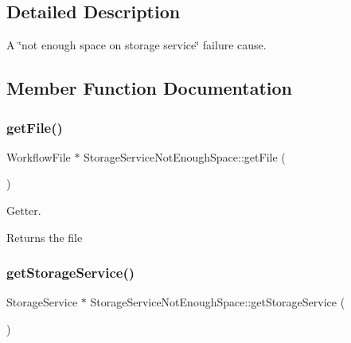 \subsection{Detailed Description}
A \char`\"{}not enough space on storage service\char`\"{} failure cause. 

\subsection{Member Function Documentation}
\mbox{\label{class_storage_service_not_enough_space_afc2e70e5464f2898a7b3e58048779fe9}} 
\subsubsection{\texorpdfstring{get\+File()}{getFile()}}
{\footnotesize\ttfamily Workflow\+File $\ast$ Storage\+Service\+Not\+Enough\+Space\+::get\+File (\begin{DoxyParamCaption}{ }\end{DoxyParamCaption})}



Getter. 

\begin{DoxyReturn}{Returns}
the file 
\end{DoxyReturn}
\mbox{\label{class_storage_service_not_enough_space_a458c8b73ddb2a600518f0cbf5cd9bdb4}} 
\subsubsection{\texorpdfstring{get\+Storage\+Service()}{getStorageService()}}
{\footnotesize\ttfamily Storage\+Service $\ast$ Storage\+Service\+Not\+Enough\+Space\+::get\+Storage\+Service (\begin{DoxyParamCaption}{ }\end{DoxyParamCaption})}



